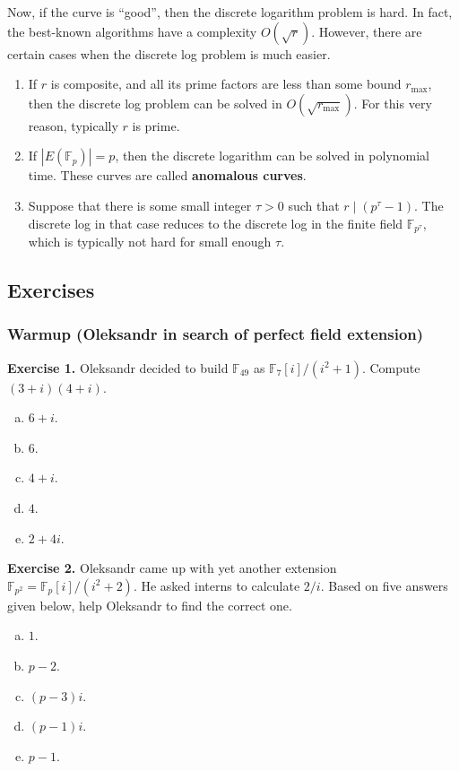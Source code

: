 \documentclass[../lecture-notes.tex]{subfiles}
\begin{document}
Now, if the curve is ``good'', then the discrete logarithm problem is hard. In fact, the best-known algorithms have a complexity $O(\sqrt{r})$. However, there are certain cases when the discrete log problem is much easier.
\begin{enumerate}
    \item If $r$ is composite, and all its prime factors are less than some bound $r_{\max}$, then the discrete log problem can be solved in $O(\sqrt{r_{\max}})$. For this very reason, typically $r$ is prime.
    \item If $|E(\mathbb{F}_p)|=p$, then the discrete logarithm can be solved in polynomial time. These curves are called \textbf{anomalous curves}.
    \item Suppose that there is some small integer $\tau>0$ such that $r \mid (p^{\tau}-1)$. The discrete log in that case reduces to the discrete log in the finite field $\mathbb{F}_{p^{\tau}}$, which is typically not hard for small enough $\tau$.
\end{enumerate}

\subsection{Exercises}
\subsubsection*{Warmup (Oleksandr in search of perfect field extension)}

\textbf{Exercise 1.} Oleksandr decided to build $\mathbb{F}_{49}$ as $\mathbb{F}_7[i]/(i^2+1)$. Compute $(3+i)(4+i)$. 

\begin{enumerate}[a)]
    \item $6+i$.
    \item $6$.
    \item $4+i$.
    \item $4$.
    \item $2+4i$.
\end{enumerate}

\textbf{Exercise 2.} Oleksandr came up with yet another extension $\mathbb{F}_{p^2} = \mathbb{F}_p[i]/(i^2+2)$. He asked interns to calculate $2/i$. Based on five answers given below, help Oleksandr to find the correct one.
\begin{enumerate}[a)]
    \item $1$.
    \item $p-2$.
    \item $(p-3)i$.
    \item $(p-1)i$.
    \item $p-1$.
\end{enumerate}
\end{document}
